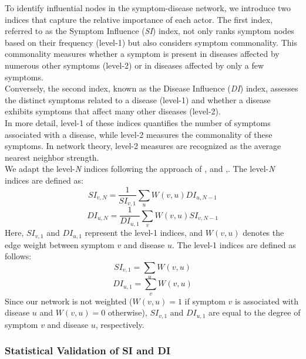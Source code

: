 To identify influential nodes in the symptom-disease network, we introduce two indices that capture the relative importance of each actor.
The first index, referred to as the Symptom Influence (\textit{SI}) index, not only ranks symptom nodes based on their frequency (level-1)
but also considers symptom commonality.
This commonality measures whether a symptom is present in diseases affected by numerous other symptoms (level-2) or in diseases affected by only a few symptoms.\\
Conversely, the second index, known as the Disease Influence (\textit{DI}) index,
assesses the distinct symptoms related to a disease (level-1) and whether a disease exhibits symptoms that affect many other diseases (level-2).\\
In more detail, level-1 of these indices quantifies the number of symptoms associated with a disease,
while level-2 measures the commonality of these symptoms. In network theory, level-2 measures are recognized as the average nearest neighbor strength.\\
We adapt the level-\textit{N} indices following the approach of \citeauthor{Hidalgo_2007},\cite{Hidalgo_2007} and  \citeauthor{Hidalgo_2009},\cite{Hidalgo_2009}.
The level-\textit{N} indices are defined as:
\begin{equation}
    SI_{v, N} = \frac{1}{SI_{v, 1}} \sum_u W(v, u) DI_{u, N-1}
\end{equation}
\begin{equation}
    DI_{u, N} = \frac{1}{DI_{u, 1}} \sum_v W(v, u) SI_{v, N-1}
\end{equation}
\noindent
Here, $SI_{v, 1}$ and $DI_{u, 1}$ represent the level-1 indices, and $W(v,u)$ denotes the edge weight between symptom $v$ and disease $u$.
The level-1 indices are defined as follows:
\begin{equation}
    SI_{v, 1} = \sum_u W(v, u)
\end{equation}
\begin{equation}
    DI_{u, 1} = \sum_v W(v, u)
\end{equation}
\noindent
Since our network is not weighted ($W(v,u)=1$ if symptom $v$ is associated with disease $u$ and $W(v,u)=0$ otherwise),
$SI_{v,1}$ and $DI_{u,1}$ are equal to the degree of symptom $v$ and disease $u$, respectively.
\subsubsection*{Statistical Validation of SI and DI}

